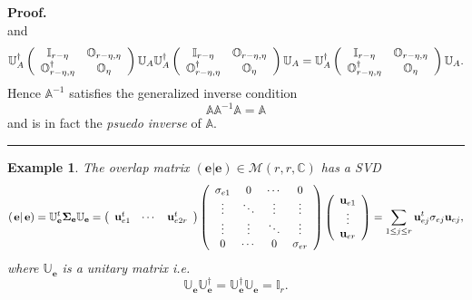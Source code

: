 \documentclass[aps,preprint]{revtex4}%
\newtheorem{example}[theorem]{Example}
\newenvironment{proof}[1][Proof]{\noindent\textbf{#1.} }{\ \rule{0.5em}{0.5em}}
\begin{document}
\begin{proof}
\begin{equation}
\end{equation}
and%
\begin{equation}
\mathbb{U}_{A}^{\dagger}\left(
\begin{array}
[c]{cc}%
\mathbb{I}_{r-\eta} & \mathbb{O}_{r-\eta,\eta}\\
\mathbb{O}_{r-\eta,\eta}^{\dagger} & \mathbb{O}_{\eta}%
\end{array}
\right)  \mathbb{U}_{A}\mathbb{U}_{A}^{\dagger}\left(
\begin{array}
[c]{cc}%
\mathbb{I}_{r-\eta} & \mathbb{O}_{r-\eta,\eta}\\
\mathbb{O}_{r-\eta,\eta}^{\dagger} & \mathbb{O}_{\eta}%
\end{array}
\right)  \mathbb{U}_{A}=\mathbb{U}_{A}^{\dagger}\left(
\begin{array}
[c]{cc}%
\mathbb{I}_{r-\eta} & \mathbb{O}_{r-\eta,\eta}\\
\mathbb{O}_{r-\eta,\eta}^{\dagger} & \mathbb{O}_{\eta}%
\end{array}
\right)  \mathbb{U}_{A}.
\end{equation}
Hence $\mathbb{A}^{-1}$ satisfies the generalized inverse condition
\begin{equation}
\mathbb{AA}^{-1}\mathbb{A=A}%
\end{equation}
and is in fact the \emph{psuedo inverse} of $\mathbb{A}.$
\end{proof}

\begin{example}
The overlap matrix $\left(  \left.  \mathbf{e}\right\vert \mathbf{e}\right)
\in\mathcal{M}\left(  r,r,\mathbb{C}\right)  $ has a SVD
\begin{equation}
\left(  \left.  \mathbf{e}\right\vert \mathbf{e}\right)  =\mathbb{U}%
_{\mathbf{e}}^{t}\mathbf{\Sigma}_{\mathbf{e}}\mathbb{U}_{\mathbf{e}}=\left(
\begin{array}
[c]{ccc}%
\mathbf{u}_{e1}^{t} & \cdots & \mathbf{u}_{e2r}^{t}%
\end{array}
\right)  \left(
\begin{array}
[c]{cccc}%
\sigma_{e1} & 0 & \cdots & 0\\
\vdots & \ddots & \vdots & \vdots\\
\vdots & \vdots & \ddots & \vdots\\
0 & \cdots & 0 & \sigma_{er}%
\end{array}
\right)  \left(
\begin{array}
[c]{c}%
\mathbf{u}_{e1}\\
\vdots\\
\mathbf{u}_{er}%
\end{array}
\right)  =\sum_{1\leq j\leq r}\mathbf{u}_{ej}^{t}\sigma_{ej}\mathbf{u}_{ej},
\end{equation}
where $\mathbb{U}_{\mathbf{e}}$ is a unitary matrix i.e.
\begin{equation}
\mathbb{U}_{\mathbf{e}}\mathbb{U}_{\mathbf{e}}^{\dagger}=\mathbb{U}%
_{\mathbf{e}}^{\dagger}\mathbb{U}_{\mathbf{e}}=\mathbb{I}_{r}.
\end{equation}

\end{example}
\end{document}
